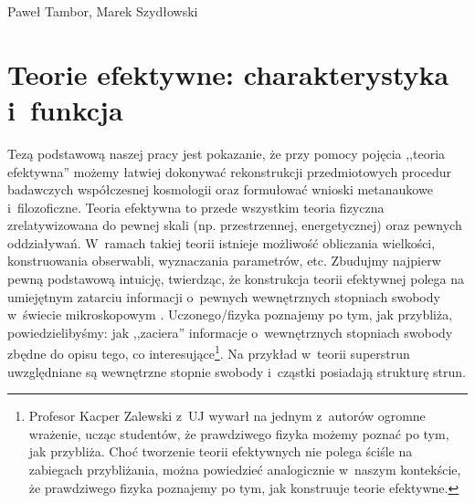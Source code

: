 \begin{artplenv2auth}{Paweł Tambor, Marek Szydłowski}
\section{Teorie efektywne: charakterystyka i~funkcja}
Tezą podstawową naszej pracy jest pokazanie, że przy pomocy pojęcia ,,teoria efektywna'' możemy łatwiej dokonywać rekonstrukcji przedmiotowych procedur badawczych współczesnej kosmologii oraz formułować wnioski metanaukowe i~filozoficzne. Teoria efektywna to przede wszystkim teoria fizyczna zrelatywizowana do pewnej skali (np. przestrzennej, energetycznej) oraz pewnych oddziaływań. W~ramach takiej teorii istnieje możliwość obliczania wielkości, konstruowania obserwabli, wyznaczania parametrów, etc. Zbudujmy najpierw pewną podstawową intuicję, twierdząc, że konstrukcja teorii efektywnej polega na umiejętnym zatarciu informacji o~pewnych wewnętrznych stopniach swobody w~świecie mikroskopowym 
\parencites{morrison_modelling_1998}{morrison_approximating_2005}.
Uczonego/fizyka poznajemy po tym, jak przybliża, powiedzielibyśmy: jak ,,zaciera'' informacje o~wewnętrznych stopniach swobody zbędne do opisu tego, co interesujące\footnote{Profesor Kacper Zalewski z~UJ wywarł na jednym z~autorów ogromne wrażenie, ucząc studentów, że prawdziwego fizyka możemy poznać po tym, jak przybliża. Choć tworzenie teorii efektywnych nie polega ściśle na zabiegach przybliżania, można powiedzieć analogicznie w~naszym kontekście, że prawdziwego fizyka poznajemy po tym, jak konstruuje teorie efektywne.}. Na przykład w~teorii superstrun uwzględniane są wewnętrzne stopnie swobody i~cząstki posiadają strukturę strun.


\end{artplenv2auth}
